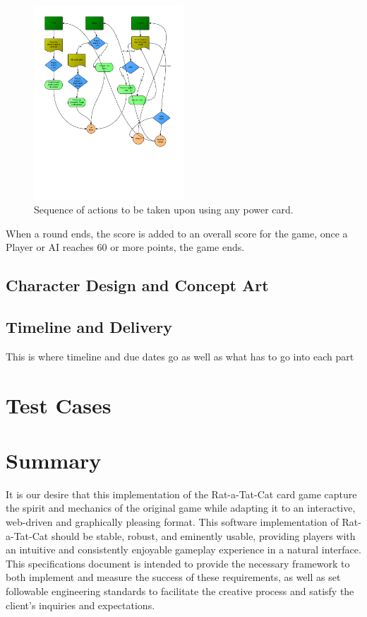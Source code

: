 \documentclass[12pt]{IEEEtran}
\begin{document}
	\begin{figure}[h]
		\centering
		\includegraphics[width=0.5\textwidth]{powercardactions.png}
		\caption{Sequence of actions to be taken upon using any power card.}
		\label{fig:powact}
	\end{figure}

	When a round ends, the score is added to an overall score for the game, once a Player or AI reaches 60 or more points, the game ends. 

\subsection{Character Design and Concept Art}
\label{subsec:cdesign}

\subsection{Timeline and Delivery}
\label{subsec:timeline}

	This is where timeline and due dates go as well as what has to go into each part

\section{Test Cases}
\label{sec:test}

\section{Summary}
\label{sec:summary}

	It is our desire that this implementation of the Rat-a-Tat-Cat card game capture the spirit and mechanics of the original game while adapting it to an interactive, web-driven and graphically pleasing format. This software implementation of Rat-a-Tat-Cat should be stable, robust, and eminently usable, providing players with an intuitive and consistently enjoyable gameplay experience in a natural interface. This specifications document is intended to provide the necessary framework to both implement and measure the success of these requirements, as well as set followable engineering standards to facilitate the creative process and satisfy the client’s inquiries and expectations.
\end{document}
